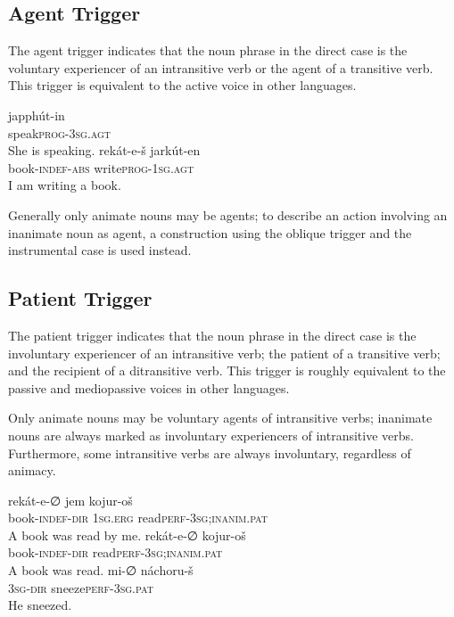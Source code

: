 \documentclass[grammar]{subfiles}
\begin{document}
\subsection{Agent Trigger}
\label{ssec:vp_agt_trigger}

The agent trigger indicates that the noun phrase in the direct case is the
voluntary experiencer of an intransitive verb or the agent of a transitive
verb.  This trigger is equivalent to the active voice in other languages.

\begin{exe}
  \ex {}
  \gll japphút-in\\
  speak\textsc{\bs prog-3sg.agt}\\
  \glt She is speaking.
  \ex {}
  \gll rekát-e-š jarkút-en\\
  book\textsc{-indef-abs} write\textsc{\bs prog-1sg.agt}\\
  \glt I am writing a book.
\end{exe}

Generally only animate nouns may be agents; to describe an action involving an
inanimate noun as agent, a construction using the oblique trigger and the
instrumental case is used instead. 


\subsection{Patient Trigger}
\label{ssec:vp_pat_trigger}

The patient trigger indicates that the noun phrase in the direct case is the
involuntary experiencer of an intransitive verb; the patient of a transitive
verb; and the recipient of a ditransitive verb.  This trigger is roughly
equivalent to the passive and mediopassive voices in other languages. 

Only animate nouns may be voluntary agents of intransitive verbs; inanimate
nouns are always marked as involuntary experiencers of intransitive verbs.
Furthermore, some intransitive verbs are always involuntary, regardless of
animacy. 

\begin{exe}
  \ex {}
  \gll rekát-e-∅ jem kojur-oš\\
  book\textsc{-indef-dir} \textsc{1sg.erg} read\textsc{\bs perf-3sg;inanim.pat}\\
  \glt A book was read by me.
  \ex {}
  \gll rekát-e-∅ kojur-oš\\
  book\textsc{-indef-dir} read\textsc{\bs perf-3sg;inanim.pat}\\
  \glt A book was read.
  \ex {}
  \gll mi-∅ náchoru-š\\
  \textsc{3sg-dir} sneeze\textsc{\bs perf-3sg.pat}\\
  \glt He sneezed.
\end{exe}
\end{document}
